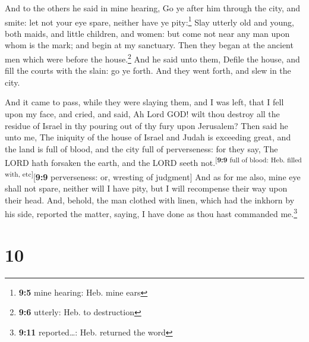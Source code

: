  And to the others he said in mine hearing, Go ye after
him through the city, and smite: let not your eye spare, neither have ye
pity:\footnote{\textbf{9:5} mine hearing: Heb. mine ears} 
Slay utterly old and young, both maids, and little children, and women:
but come not near any man upon whom is the mark; and begin at my
sanctuary. Then they began at the ancient men which were before the
house.\footnote{\textbf{9:6} utterly: Heb. to destruction}
 And he said unto them, Defile the house, and fill the
courts with the slain: go ye forth. And they went forth, and slew in the
city.

 And it came to pass, while they were slaying them, and I
was left, that I fell upon my face, and cried, and said, Ah Lord GOD!
wilt thou destroy all the residue of Israel in thy pouring out of thy
fury upon Jerusalem?  Then said he unto me, The iniquity
of the house of Israel and Judah is exceeding great, and the land is
full of blood, and the city full of perverseness: for they say, The LORD
hath forsaken the earth, and the LORD seeth
not.\textsuperscript{{[}\textbf{9:9} full of blood: Heb. filled with,
etc{]}}{[}\textbf{9:9} perverseness: or, wresting of judgment{]}
 And as for me also, mine eye shall not spare, neither
will I have pity, but I will recompense their way upon their head.
 And, behold, the man clothed with linen, which had the
inkhorn by his side, reported the matter, saying, I have done as thou
hast commanded me.\footnote{\textbf{9:11} reported\ldots: Heb. returned
  the word}

\hypertarget{section-9}{%
\section{10}\label{section-9}}

